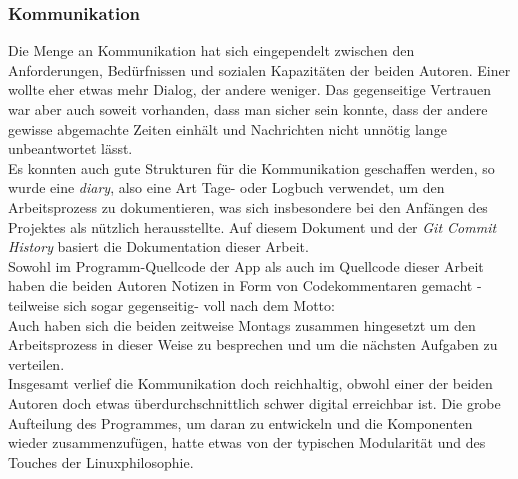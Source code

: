 \documentclass[a4paper,11pt]{article}
\begin{document}
\subsubsection{Kommunikation}

Die Menge an Kommunikation hat sich eingependelt zwischen den Anforderungen, Bedürfnissen und sozialen Kapazitäten der beiden Autoren. Einer wollte eher etwas mehr Dialog, der andere weniger. Das gegenseitige Vertrauen war aber auch soweit vorhanden, dass man sicher sein konnte, dass der andere gewisse abgemachte Zeiten einhält und Nachrichten nicht unnötig lange unbeantwortet lässt.\\

Es konnten auch gute Strukturen für die Kommunikation geschaffen werden, so wurde eine \textit{diary}, also eine Art Tage- oder Logbuch verwendet, um den Arbeitsprozess zu dokumentieren, was sich insbesondere bei den Anfängen des Projektes als nützlich herausstellte. Auf diesem Dokument und der \textit{Git Commit History} basiert die Dokumentation dieser Arbeit.\\

Sowohl im Programm-Quellcode der App als auch im Quellcode dieser Arbeit haben die beiden Autoren Notizen in Form von Codekommentaren gemacht - teilweise sich sogar gegenseitig- voll nach dem Motto: \\

Auch haben sich die beiden zeitweise Montags zusammen hingesetzt um den Arbeitsprozess in dieser Weise zu besprechen und um die nächsten Aufgaben zu verteilen.\\

Insgesamt verlief die Kommunikation doch reichhaltig, obwohl einer der beiden Autoren doch etwas überdurchschnittlich schwer digital erreichbar ist. Die grobe Aufteilung des Programmes, um daran zu entwickeln und die Komponenten wieder zusammenzufügen, hatte etwas von der typischen Modularität und des Touches der Linuxphilosophie.
\end{document}
